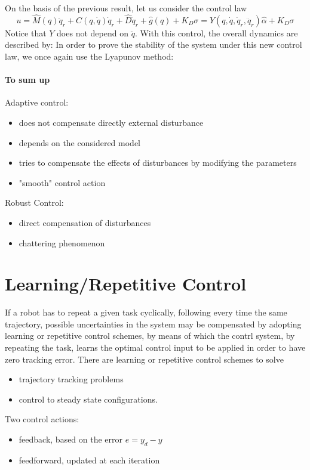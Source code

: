\documentclass{book}
\begin{document}
On the basis of the previous result, let us consider the control law 
\[
    u = \hat{M}(q)\ddot{q}_r+\hat{C}(q,\dot{q})\dot{q}_r+\hat{D}\dot{q}_r+\hat{g}(q)+K_D\sigma = Y(q,\dot{q},\dot{q}_r,\ddot{q}_r)\hat{\alpha}+K_D\sigma
\]
Notice that $Y$ does not depend on $\ddot{q}$. 
With this control, the overall dynamics are described by:
In order to prove the stability of the system under this new control law, we once again use the Lyapunov method: 
\subsubsection{To sum up}

Adaptive control:
\begin{itemize}
    \item does not compensate directly external disturbance
    \item depends on the considered model 
    \item tries to compensate the effects of disturbances by modifying the parameters 
    \item "smooth" control action
\end{itemize}

Robust Control:
\begin{itemize}
    \item direct compensation of disturbances 
    \item chattering phenomenon
\end{itemize}







\chapter{Learning/Repetitive Control}
If a robot has to repeat a given task cyclically, following every time the same trajectory, possible uncertainties in the system may be compensated by adopting learning or repetitive control schemes, by means of which the contrl system, by repeating the task, learns the optimal control input to be applied in order to have zero tracking error. There are learning or repetitive control schemes to solve 
\begin{itemize}
    \item trajectory tracking problems 
    \item control to steady state configurations.
\end{itemize}
Two control actions: 
\begin{itemize}
    \item feedback, based on the error $e=y_d-y$ 
    \item feedforward, updated at each iteration
\end{itemize}
\end{document}
